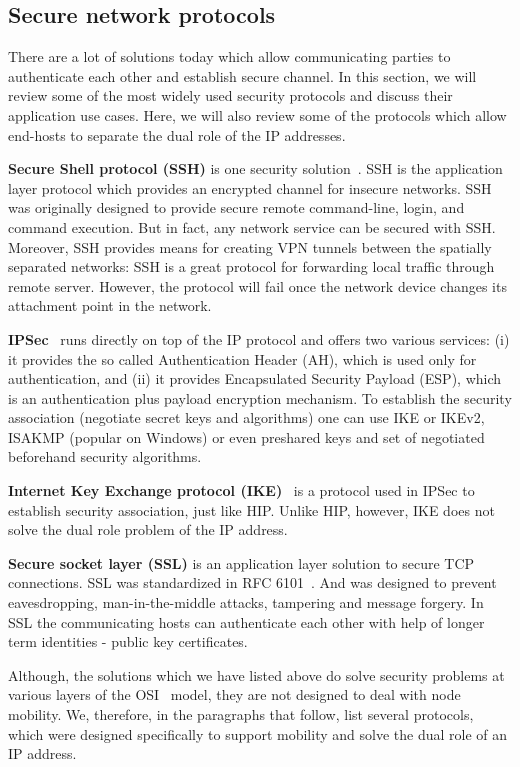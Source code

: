 \subsection{Secure network protocols}

There are a lot of solutions today which allow communicating parties 
to authenticate each other and establish secure channel. In this section,
we will review some of the most widely used security protocols and discuss
their application use cases. Here, we will also review some of the 
protocols which allow end-hosts to separate the dual role of the IP addresses.

{\bf Secure Shell protocol (SSH)} is one security solution~\cite{ssh}. SSH is
the application layer protocol which provides an encrypted channel for insecure
networks. SSH was originally designed to provide secure  
remote command-line, login, and command execution. But in fact, 
any network service can be secured with SSH. Moreover, SSH provides
means for creating VPN tunnels between the spatially separated networks:
SSH is a great protocol for forwarding local traffic through remote 
server. However, the protocol will fail once the network device changes its 
attachment point in the network. 

{\bf IPSec}~\cite{ipsec} runs directly on top of the IP protocol and offers two 
various services: (i) it provides the so called Authentication Header (AH),
which is used only for authentication, and 
(ii) it provides Encapsulated Security Payload (ESP), which is an authentication 
plus payload encryption mechanism. To establish the security association (negotiate
secret keys and algorithms) one can use IKE or IKEv2, ISAKMP (popular on Windows) or
even preshared keys and set of negotiated beforehand security algorithms. 

{\bf Internet Key Exchange protocol (IKE)}~\cite{rfc5996} is a protocol used in IPSec to establish
security association, just like HIP. Unlike HIP, however, IKE does not solve the 
dual role problem of the IP address.

{\bf Secure socket layer (SSL)} is an application layer solution to secure TCP 
connections. SSL was standardized in RFC 6101~\cite{rfc6101}. And was designed 
to prevent eavesdropping, man-in-the-middle attacks, tampering and message forgery.
In SSL the communicating hosts can authenticate each other with help of 
longer term identities - public key certificates.

Although, the solutions which we have listed above do solve security problems
at various layers of the OSI~\cite{osi} model, they are not designed to deal with node 
mobility. We, therefore, in the paragraphs that follow, list several protocols,
which were designed specifically to support mobility and solve the dual role of 
an IP address.

